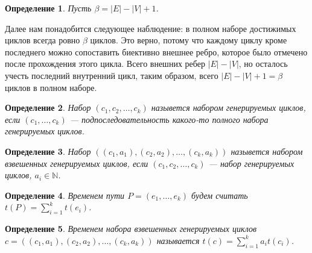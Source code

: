 \documentclass{article}
\newcommand{\squad}{
    \hspace{0.5em}
}
\newtheorem{corollary}{Предложение}
\newtheorem{definition}{Определение}
\begin{document}
\begin{definition}
    Пусть $\beta = |E| - |V| + 1$.
\end{definition}

Далее нам понадобится следующее наблюдение: в полном наборе достижимых циклов всегда ровно $\beta$ циклов. Это верно, потому что каждому циклу кроме последнего можно сопоставить биективно внешнее ребро, которое было отмечено после прохождения этого цикла. Всего внешних ребер $|E| - |V|$, но осталось учесть последний внутренний цикл, таким образом, всего $|E| - |V| + 1 = \beta$ циклов в полном наборе. 



\begin{definition}
    Набор $(c_{1}, c_{2}, \ldots, c_{k})$ назывется набором генерируемых циклов, если $(c_{1}, \ldots, c_{k})$ --- подпоследовательность какого-то полного набора генерируемых циклов.
\end{definition}



\begin{definition}
    \label{gen}
    Набор $((c_{1}, a_{1}), (c_{2}, a_{2}), \ldots, (c_{k}, a_{k}))$ назывется набором взвешенных генерируемых циклов, если $(c_{1}, c_{2}, \ldots, c_{k})$ --- набор генерируемых циклов, $a_{i} \in \mathbb{N}$.
\end{definition}

\begin{definition}
    Временем пути $P = (e_{1}, \ldots, e_{k})$ будем считать $t(P) = \sum_{i = 1}^{k}{t(e_{i})}$.  
\end{definition}

\begin{definition}
    Временем набора взвешенных генерируемых циклов $c = ((c_{1}, a_{1}), (c_{2}, a_{2}), \ldots, (c_{k}, a_{k}))$ называется $t(c) = \sum_{i = 1}^{k}{a_{i}t(c_{i})}$. 
\end{definition}
\end{document}
